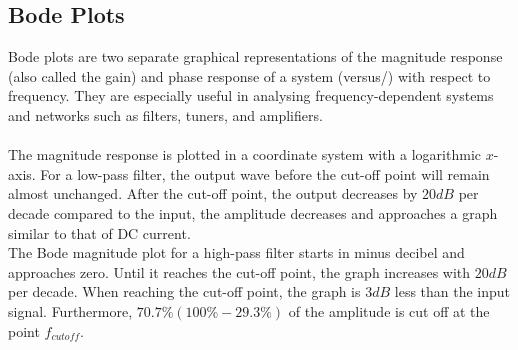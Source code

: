 \subsection{Bode Plots} \label{sub:bode}
Bode plots are two separate graphical representations of the magnitude response (also called the gain) and phase response of a system (versus/) with respect to frequency. They are especially useful in analysing frequency-dependent systems and networks such as filters, tuners, and amplifiers. \cite [p. 626]{bcircuit5}  \\
\\
The magnitude response is plotted in a coordinate system with a logarithmic $x$-axis. For a low-pass filter, the output wave before the cut-off point will remain almost unchanged. After the cut-off point, the output decreases by $20 dB$ per decade compared to the input, the amplitude decreases and approaches a graph similar to that of DC current. \\
The Bode magnitude plot for a high-pass filter starts in minus decibel and approaches zero. Until it reaches the cut-off point, the graph increases with $20 dB$ per decade. When reaching the cut-off point, the graph is $3 dB$ less than the input signal. Furthermore, $70.7\% (100\%-29.3\%)$ of the amplitude is cut off at the point $f_{cutoff}$.


